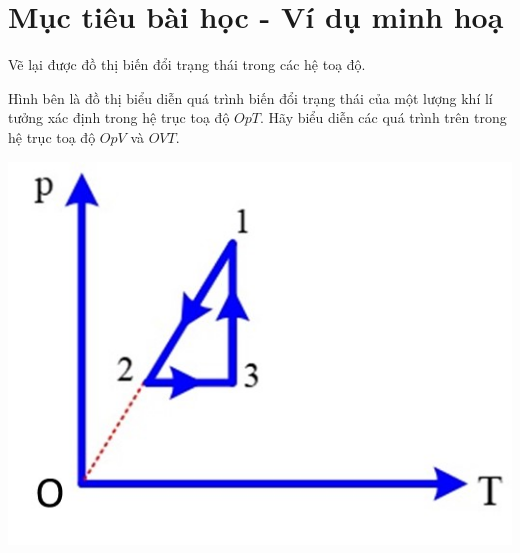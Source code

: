 \section{Mục tiêu bài học - Ví dụ minh hoạ}
\begin{dang}{Vẽ lại được đồ thị biến đổi trạng thái trong các hệ toạ độ.}
	{Hình bên là đồ thị biểu diễn quá trình biến đổi trạng thái của một lượng khí lí tưởng xác định trong hệ trục toạ độ $OpT$. Hãy biểu diễn các quá trình trên trong hệ trục toạ độ $OpV$ và $OVT$.
		\begin{center}
			\includegraphics[width=0.25\linewidth]{../figs/VN12-Y24-PH-SYL-014-2}
		\end{center}
	
}
{}
\end{dang}
